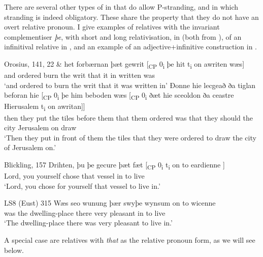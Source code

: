 \documentclass[output=paper]{langsci/langscibook}
\begin{document}
There are several other types of  in 
that do allow P-stranding, and in which stranding is indeed obligatory. These
share the property that they do not have an overt relative pronoun. I give
examples of relatives with the invariant complementiser \textit{þe}, with short
and long relativisation, in  (both from
\citealt[147--148]{vanKemenade1987}), of an infinitival relative in
, and an example of an adjective+infinitive construction in
.

\ea%
    \label{ex:key:11.3} Orosius, 141, 22 \parencite[147]{vanKemenade1987}
    \ea
	\gll \& het         forbærnan þæt gewrit [\textsubscript{CP} 0\textsubscript{i} þe   hit  t\textsubscript{i} on awriten wæs]\\
		and ordered burn          the   writ {} {}           that it  {}    in written   was\\
	\glt ‘and ordered to burn the writ that it was written in’
	\ex
	\gll Đonne hie lecgeað ða tiglan beforan  hie    [\textsubscript{CP} 0\textsubscript{i} þe    him beboden wæs [\textsubscript{CP} 0\textsubscript{i} ðæt hie sceoldon ða ceastre Hierusalem  t\textsubscript{i} on awritan]]\\
		then    they put     the tiles   before    them  {} {}        that  them ordered was {} {} that they should the city Jerusalem             {} on  draw\\
	\glt ‘Then they put in front of them the tiles that they were ordered to draw the city of Jerusalem on.’
	\z
\z

\ea Blickling, 157 \parencite[151]{vanKemenade1987}\label{ex:key:11.4}
    \sn
    \gll Drihten, þu   þe           gecure þæt fæt      [\textsubscript{CP} 0\textsubscript{i}     t\textsubscript{i} on to eardienne ]\\
        Lord,      you yourself chose   that vessel  {} {} {}                  in to live\\
    \glt ‘Lord, you chose for yourself that vessel to live in.’
\z

\ea LS8 (Eust) 315 \parencite[266]{Fischeretal:2000}%
    \label{ex:key:11.5}
    \sn
    \gll Wæs seo wunung       þær    swyþe wynsum on  to wicenne \\
        was the dwelling-place  there very   pleasant  in  to live\\
    \glt `The dwelling-place there was very pleasant to live in.'
\z

A special case are relatives with \textit{that} as the relative pronoun form,
as we will see below.
\end{document}
